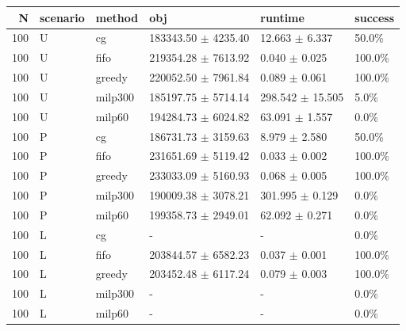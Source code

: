 \begin{tabular}{rlllll}
\toprule
N & scenario & method & obj & runtime & success \\
\midrule
100 & U & cg & 183343.50 $\pm$ 4235.40 & 12.663 $\pm$ 6.337 & 50.0\% \\
100 & U & fifo & 219354.28 $\pm$ 7613.92 & 0.040 $\pm$ 0.025 & 100.0\% \\
100 & U & greedy & 220052.50 $\pm$ 7961.84 & 0.089 $\pm$ 0.061 & 100.0\% \\
100 & U & milp300 & 185197.75 $\pm$ 5714.14 & 298.542 $\pm$ 15.505 & 5.0\% \\
100 & U & milp60 & 194284.73 $\pm$ 6024.82 & 63.091 $\pm$ 1.557 & 0.0\% \\
100 & P & cg & 186731.73 $\pm$ 3159.63 & 8.979 $\pm$ 2.580 & 50.0\% \\
100 & P & fifo & 231651.69 $\pm$ 5119.42 & 0.033 $\pm$ 0.002 & 100.0\% \\
100 & P & greedy & 233033.09 $\pm$ 5160.93 & 0.068 $\pm$ 0.005 & 100.0\% \\
100 & P & milp300 & 190009.38 $\pm$ 3078.21 & 301.995 $\pm$ 0.129 & 0.0\% \\
100 & P & milp60 & 199358.73 $\pm$ 2949.01 & 62.092 $\pm$ 0.271 & 0.0\% \\
100 & L & cg & - & - & 0.0\% \\
100 & L & fifo & 203844.57 $\pm$ 6582.23 & 0.037 $\pm$ 0.001 & 100.0\% \\
100 & L & greedy & 203452.48 $\pm$ 6117.24 & 0.079 $\pm$ 0.003 & 100.0\% \\
100 & L & milp300 & - & - & 0.0\% \\
100 & L & milp60 & - & - & 0.0\% \\
\bottomrule
\end{tabular}
